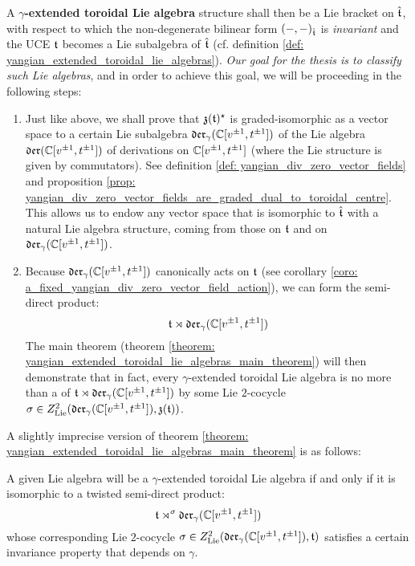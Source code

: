         A \textbf{$\gamma$-extended toroidal Lie algebra} structure shall then be a Lie bracket on $\hat{\mathfrak{t}}$, with respect to which the non-degenerate bilinear form $(-, -)_{\hat{\mathfrak{t}}}$ is \textit{invariant} and the UCE $\mathfrak{t}$ becomes a Lie subalgebra of $\hat{\mathfrak{t}}$ (cf. definition \ref{def: yangian_extended_toroidal_lie_algebras}). \textit{Our goal for the thesis is to classify such Lie algebras}, and in order to achieve this goal, we will be proceeding in the following steps:
        \begin{enumerate}
            \item Just like above, we shall prove that $\mathfrak{z}(\mathfrak{t})^{\star}$ is graded-isomorphic as a vector space to a certain Lie subalgebra $\mathfrak{der}_{\gamma}(\mathbb{C}[v^{\pm 1}, t^{\pm 1}])$ of the Lie algebra $\mathfrak{der}(\mathbb{C}[v^{\pm 1}, t^{\pm 1}])$ of derivations on $\mathbb{C}[v^{\pm 1}, t^{\pm 1}]$ (where the Lie structure is given by commutators). See definition \ref{def: yangian_div_zero_vector_fields} and proposition \ref{prop: yangian_div_zero_vector_fields_are_graded_dual_to_toroidal_centre}. This allows us to endow any vector space that is isomorphic to $\hat{\mathfrak{t}}$ with a natural Lie algebra structure, coming from those on $\mathfrak{t}$ and on $\mathfrak{der}_{\gamma}(\mathbb{C}[v^{\pm 1}, t^{\pm 1}])$. 
            \item Because $\mathfrak{der}_{\gamma}(\mathbb{C}[ v^{\pm 1}, t^{\pm 1} ])$ canonically acts on $\mathfrak{t}$ (see corollary \ref{coro: a_fixed_yangian_div_zero_vector_field_action}), we can form the semi-direct product:
                $$\mathfrak{t} \rtimes \mathfrak{der}_{\gamma}(\mathbb{C}[ v^{\pm 1}, t^{\pm 1} ])$$
            The main theorem (theorem \ref{theorem: yangian_extended_toroidal_lie_algebras_main_theorem}) will then demonstrate that in fact, every $\gamma$-extended toroidal Lie algebra is no more than a  of $\mathfrak{t} \rtimes \mathfrak{der}_{\gamma}(\mathbb{C}[ v^{\pm 1}, t^{\pm 1} ])$ by some Lie $2$-cocycle $\sigma \in Z^2_{\mathrm{Lie}}(\mathfrak{der}_{\gamma}(\mathbb{C}[ v^{\pm 1}, t^{\pm 1} ]), \mathfrak{z}(\mathfrak{t}))$.
        \end{enumerate}
        A slightly imprecise version of theorem \ref{theorem: yangian_extended_toroidal_lie_algebras_main_theorem} is as follows:
        \begin{theorem}
            A given Lie algebra will be a $\gamma$-extended toroidal Lie algebra if and only if it is isomorphic to a twisted semi-direct product:
                $$\mathfrak{t} \rtimes^{\sigma} \mathfrak{der}_{\gamma}(\mathbb{C}[v^{\pm 1}, t^{\pm 1}])$$
            whose corresponding Lie $2$-cocycle $\sigma \in Z^2_{\mathrm{Lie}}(\mathfrak{der}_{\gamma}(\mathbb{C}[v^{\pm 1}, t^{\pm 1}]), \mathfrak{t})$ satisfies a certain invariance property that depends on $\gamma$.
        \end{theorem}

